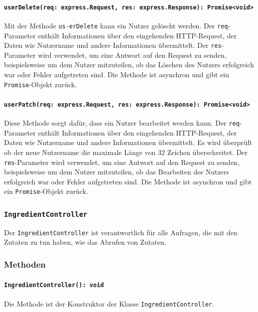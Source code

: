 \documentclass{entwurfsheft}
\begin{document}
\begin{sloppypar}
\paragraph{\texttt{userDelete(req: express.Request, res: express.Response): Promise<void>\\}}
Mit der Methode \texttt{us-erDelete} kann ein Nutzer gelöscht werden. Der \texttt{req}-Parameter enthält Informationen über den eingehenden HTTP-Request, der Daten wie Nutzername und andere Informationen übermittelt. Der \texttt{res}-Parameter wird verwendet, um eine Antwort auf den Request zu senden, beispielsweise um dem Nutzer mitzuteilen, ob das Löschen des Nutzers erfolgreich war oder Fehler aufgetreten sind.
Die Methode ist asynchron und gibt ein \texttt{Promise}-Objekt zurück.

\paragraph{\texttt{userPatch(req: express.Request, res: express.Response): Promise<void>\\}}
Diese Methode sorgt dafür, dass ein Nutzer bearbeitet werden kann. Der \texttt{req}-Parameter enthält Informationen über den eingehenden HTTP-Request, der Daten wie Nutzername und andere Informationen übermittelt. Es wird überprüft ob der neue Nutzername die maximale Länge von 32 Zeichen überschreitet. Der \texttt{res}-Parameter wird verwendet, um eine Antwort auf den Request zu senden, beispielsweise um dem Nutzer mitzuteilen, ob das Bearbeiten des Nutzers erfolgreich war oder Fehler aufgetreten sind.
Die Methode ist asynchron und gibt ein \texttt{Promise}-Objekt zurück.

\subsubsection{\texttt{IngredientController}}\label{sec:IngredientController}
Der \texttt{IngredientController} ist verantwortlich für alle Anfragen, die mit den Zutaten zu tun haben, wie das Abrufen von Zutaten.
\subsubsection*{Methoden}
\paragraph{\texttt{IngredientController(): void\\}}
Die Methode ist der Konstruktor der Klasse \texttt{IngredientController}.

\end{sloppypar}
\end{document}
